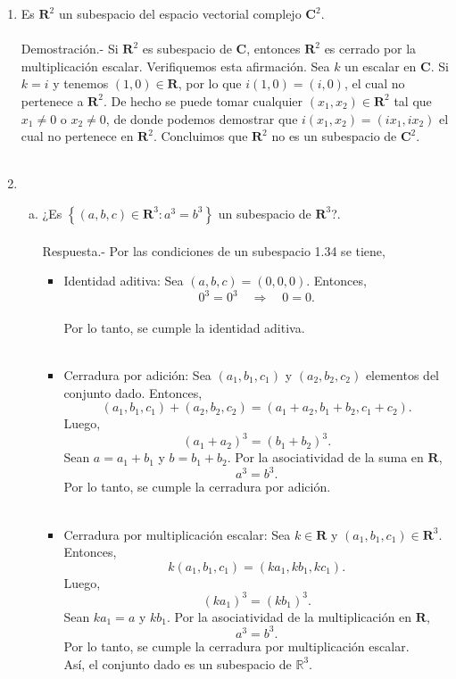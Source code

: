 \begin{enumerate}[\bfseries 1.]
    \item Es $\textbf{R}^2$ un subespacio del espacio vectorial complejo $\textbf{C}^2$.\\\\
	Demostración.-\; Si $\textbf{R}^2$ es subespacio de $\textbf{C}$, entonces $\textbf{R}^2$ es cerrado por la multiplicación escalar. Verifiquemos esta afirmación. Sea $k$ un escalar en $\textbf{C}$. Si $k=i$ y tenemos $(1,0)\in \textbf{R}$, por lo que $i(1,0)=(i,0)$, el cual no pertenece a $\textbf{R}^2.$ De hecho se puede tomar cualquier $(x_1,x_2)\in \textbf{R}^2$ tal que $x_1\neq 0$ o $x_2\neq 0$, de donde podemos demostrar que $i(x_1,x_2)=(ix_1,ix_2)$ el cual no pertenece en $\textbf{R}^2$. Concluimos que $\textbf{R}^2$ no es un subespacio de $\textbf{C}^2.$\\\\

    \item 
	\begin{enumerate}[(a)]

	    \item ¿Es $\left\{(a,b,c) \in \textbf{R}^3 : a^3=b^3 \right\}$ un subespacio de $\textbf{R}^3$?.\\\\
		Respuesta.-\; Por las condiciones de un subespacio 1.34 se tiene,\\
		\begin{itemize}
		    \item Identidad aditiva: Sea $(a,b,c)=(0,0,0)$. Entonces,
			$$0^3=0^3\quad \Rightarrow \quad 0=0.$$\\
			Por lo tanto, se cumple la identidad aditiva.\\\\
		    \item Cerradura por adición: Sea $(a_1,b_1,c_1)$ y $(a_2,b_2,c_2)$ elementos del conjunto dado. Entonces,
			$$(a_1,b_1,c_1)+(a_2,b_2,c_2)=(a_1+a_2,b_1+b_2,c_1+c_2).$$
			Luego,
			$$\left(a_1+a_2\right)^3=\left(b_1+b_2\right)^3.$$
			Sean $a=a_1+b_1$ y $b=b_1+b_2$. Por la asociatividad de la suma en $\textbf{R}$,
			$$a^3=b^3.$$
			Por lo tanto, se cumple la cerradura por adición.\\\\
		    \item Cerradura por multiplicación escalar: Sea $k\in \textbf{R}$ y $(a_1,b_1,c_1)\in \textbf{R}^3$. Entonces,
			$$k(a_1,b_1,c_1)=(ka_1,kb_1,kc_1).$$
			Luego,
			$$\left(ka_1\right)^3=\left(kb_1\right)^3.$$
			Sean $ka_1=a$ y $kb_1$. Por la asociatividad de la multiplicación en $\textbf{R}$,
			$$a^3=b^3.$$
			Por lo tanto, se cumple la cerradura por multiplicación escalar.\\
			Así, el conjunto dado es un subespacio de $\mathbb{R}^3$.\\\\
		\end{itemize}


\end{enumerate}
\end{enumerate}
